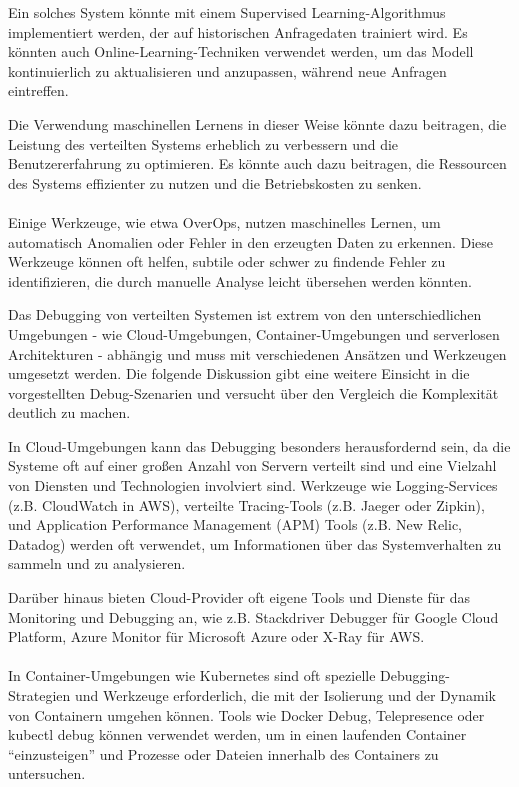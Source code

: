 \documentclass[../vs-script-first-v01.tex]{subfiles}
\begin{document}
Ein solches System könnte mit einem Supervised Learning-Algorithmus implementiert werden, der auf historischen Anfragedaten trainiert wird. Es könnten auch Online-Learning-Techniken verwendet werden, um das Modell kontinuierlich zu aktualisieren und anzupassen, während neue Anfragen eintreffen.

Die Verwendung maschinellen Lernens in dieser Weise könnte dazu beitragen, die Leistung des verteilten Systems erheblich zu verbessern und die Benutzererfahrung zu optimieren. Es könnte auch dazu beitragen, die Ressourcen des Systems effizienter zu nutzen und die Betriebskosten zu senken.
\\\\
Einige Werkzeuge, wie etwa OverOps, nutzen maschinelles Lernen, um automatisch Anomalien oder Fehler in den erzeugten Daten zu erkennen. Diese Werkzeuge können oft helfen, subtile oder schwer zu findende Fehler zu identifizieren, die durch manuelle Analyse leicht übersehen werden könnten.

Das Debugging von verteilten Systemen ist extrem von den unterschiedlichen Umgebungen - wie Cloud-Umgebungen, Container-Umgebungen und serverlosen Architekturen - abhängig und muss mit verschiedenen Ansätzen und Werkzeugen umgesetzt werden. Die folgende Diskussion gibt eine weitere Einsicht in die vorgestellten Debug-Szenarien und versucht über den Vergleich die Komplexität deutlich zu machen. 

In Cloud-Umgebungen kann das Debugging besonders herausfordernd sein, da die Systeme oft auf einer großen Anzahl von Servern verteilt sind und eine Vielzahl von Diensten und Technologien involviert sind. Werkzeuge wie Logging-Services (z.B. CloudWatch in AWS), verteilte Tracing-Tools (z.B. Jaeger oder Zipkin), und Application Performance Management (APM) Tools (z.B. New Relic, Datadog) werden oft verwendet, um Informationen über das Systemverhalten zu sammeln und zu analysieren.

Darüber hinaus bieten Cloud-Provider oft eigene Tools und Dienste für das Monitoring und Debugging an, wie z.B. Stackdriver Debugger für Google Cloud Platform, Azure Monitor für Microsoft Azure oder X-Ray für AWS.
\\\\
In Container-Umgebungen wie Kubernetes sind oft spezielle Debugging-Strategien und Werkzeuge erforderlich, die mit der Isolierung und der Dynamik von Containern umgehen können. Tools wie Docker Debug, Telepresence oder kubectl debug können verwendet werden, um in einen laufenden Container \enquote{einzusteigen} und Prozesse oder Dateien innerhalb des Containers zu untersuchen.
\end{document}
